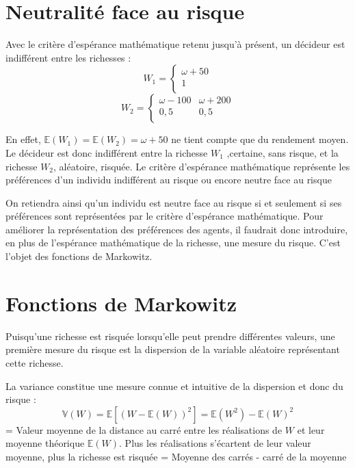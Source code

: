\documentclass[a4paper, 12pt]{report}
\begin{document}
\section{Neutralité face au risque}

Avec le critère d'espérance mathématique retenu jusqu'à présent, un décideur est indifférent entre les richesses :
$$
W_1= \left\{\begin{matrix}
	\omega+50\\
	1 \\
\end{matrix}\right.
$$
$$
W_2= \left\{\begin{matrix}
	\omega-100 & \omega+200 \\
	0,5 & 0,5 \\
\end{matrix}\right.
$$

En effet, $\mathbb{E}(W_1) =\mathbb{E}(W_2) = \omega +50$ ne tient compte que du rendement moyen. Le décideur est donc indifférent entre la richesse $W_1$ ,certaine, sans risque, et la richesse $W_2$, aléatoire, risquée.  Le critère d'espérance mathématique représente les préférences d'un individu indifférent au risque ou encore neutre face au risque

On retiendra ainsi qu'un individu est neutre face au risque si et seulement si ses préférences sont représentées par le critère d'espérance mathématique. Pour améliorer la représentation des préférences des agents, il faudrait donc introduire, en plus de l'espérance mathématique de la richesse, une mesure du risque. C'est l'objet des fonctions de Markowitz.

\section{Fonctions de Markowitz}

Puisqu'une richesse est risquée lorsqu'elle peut prendre différentes valeurs, une première mesure du risque est la dispersion de la variable aléatoire représentant cette richesse. 

La variance constitue une mesure connue et intuitive de la dispersion et donc du risque :
$$
\mathbb{V}(W)=\mathbb{E}\left[(W-\mathbb{E}(W))^2\right]= \mathbb{E}(W^2)-\mathbb{E}(W)^2
$$
= Valeur moyenne de la distance au carré entre les réalisations de
$W$ et leur moyenne théorique $\mathbb{E}(W)$. Plus les réalisations s'écartent de leur valeur moyenne, plus la richesse est risquée = Moyenne des carrés - carré de la moyenne
\end{document}
